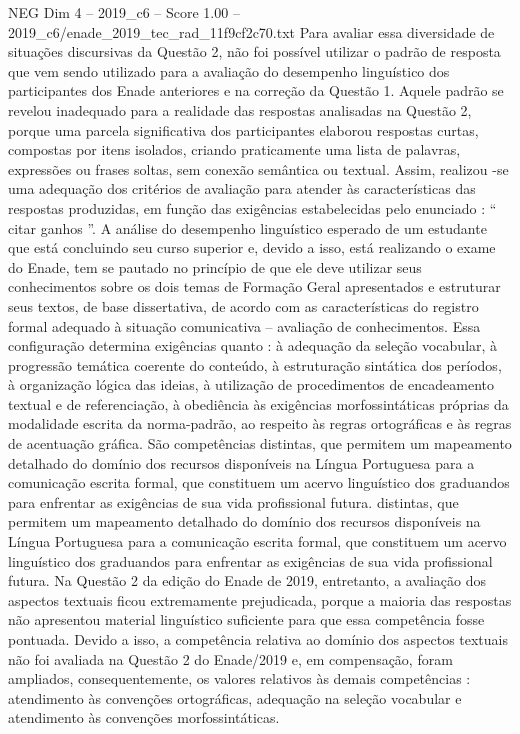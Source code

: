 \begin{textsample}{NEG Dim 4 – 2019\_c6 – Score 1.00 – 2019\_c6/enade\_2019\_tec\_rad\_11f9cf2c70.txt}
Para avaliar essa diversidade de situações discursivas da Questão 2, não foi possível utilizar o padrão de resposta que vem sendo utilizado para a avaliação do desempenho linguístico dos participantes dos Enade anteriores e na correção da Questão 1.
Aquele padrão se revelou inadequado para a realidade das respostas analisadas na Questão 2, porque uma parcela significativa dos participantes elaborou respostas curtas, compostas por itens isolados, criando praticamente uma lista de palavras, expressões ou frases soltas, sem conexão semântica ou textual.
Assim, realizou -se uma adequação dos critérios de avaliação para atender às características das respostas produzidas, em função das exigências estabelecidas pelo enunciado : “ citar ganhos ”.
A análise do desempenho linguístico esperado de um estudante que está concluindo seu curso superior e, devido a isso, está realizando o exame do Enade, tem se pautado no princípio de que ele deve utilizar seus conhecimentos sobre os dois temas de Formação Geral apresentados e estruturar seus textos, de base dissertativa, de acordo com as características do registro formal adequado à situação comunicativa – avaliação de conhecimentos.
Essa configuração determina exigências quanto : à adequação da seleção vocabular, à progressão temática coerente do conteúdo, à estruturação sintática dos períodos, à organização lógica das ideias, à utilização de procedimentos de encadeamento textual e de referenciação, à obediência às exigências morfossintáticas próprias da modalidade escrita da norma-padrão, ao respeito às regras ortográficas e às regras de acentuação gráfica.
São competências distintas, que permitem um mapeamento detalhado do domínio dos recursos disponíveis na Língua Portuguesa para a comunicação escrita formal, que constituem um acervo linguístico dos graduandos para enfrentar as exigências de sua vida profissional futura. distintas, que permitem um mapeamento detalhado do domínio dos recursos disponíveis na Língua Portuguesa para a comunicação escrita formal, que constituem um acervo linguístico dos graduandos para enfrentar as exigências de sua vida profissional futura.
Na Questão 2 da edição do Enade de 2019, entretanto, a avaliação dos aspectos textuais ficou extremamente prejudicada, porque a maioria das respostas não apresentou material linguístico suficiente para que essa competência fosse pontuada.
Devido a isso, a competência relativa ao domínio dos aspectos textuais não foi avaliada na Questão 2 do Enade/2019 e, em compensação, foram ampliados, consequentemente, os valores relativos às demais competências : atendimento às convenções ortográficas, adequação na seleção vocabular e atendimento às convenções morfossintáticas.

\end{textsample}
